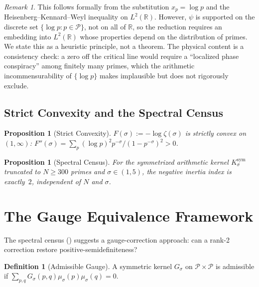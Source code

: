 \documentclass[12pt,a4paper]{article}
\newtheorem{proposition}[theorem]{Proposition}
\theoremstyle{definition}
\newtheorem{definition}[theorem]{Definition}
\theoremstyle{remark}
\newtheorem{remark}[theorem]{Remark}
\newcommand{\Ksym}{K_\sigma^{\mathrm{sym}}}
\newcommand{\muG}{\mu_\sigma}
\newcommand{\PP}{\mathcal{P}}
\begin{document}
\begin{remark}
This follows formally from the substitution $x_p = \log p$ and the Heisenberg--Kennard--Weyl inequality on $L^2(\mathbb{R})$. However, $\psi$ is supported on the discrete set $\{\log p : p \in \PP\}$, not on all of $\mathbb{R}$, so the reduction requires an embedding into $L^2(\mathbb{R})$ whose properties depend on the distribution of primes. We state this as a heuristic principle, not a theorem. The physical content is a consistency check: a zero off the critical line would require a ``localized phase conspiracy'' among finitely many primes, which the arithmetic incommensurability of $\{\log p\}$ makes implausible but does not rigorously exclude.
\end{remark}

\subsection{Strict Convexity and the Spectral Census}

\begin{proposition}[Strict Convexity]
\label{prop:convexity}
$F(\sigma) := -\log\zeta(\sigma)$ is strictly convex on $(1,\infty)$: $F''(\sigma) = \sum_p (\log p)^2 p^{-\sigma}/(1-p^{-\sigma})^2 > 0$.
\end{proposition}

\begin{proposition}[Spectral Census]
\label{prop:spectral-census}
For the symmetrized arithmetic kernel $\Ksym$ truncated to $N \geq 300$ primes and $\sigma \in (1, 5)$, the negative inertia index is exactly~$2$, independent of $N$ and $\sigma$.
\end{proposition}


\section{The Gauge Equivalence Framework}
\label{sec:gauge}

The spectral census () suggests a gauge-correction approach: can a rank-2 correction restore positive-semidefiniteness?

\begin{definition}[Admissible Gauge]
A symmetric kernel $G_\sigma$ on $\PP \times \PP$ is admissible if $\sum_{p,q}G_\sigma(p,q)\muG(p)\muG(q) = 0$.
\end{definition}
\end{document}
